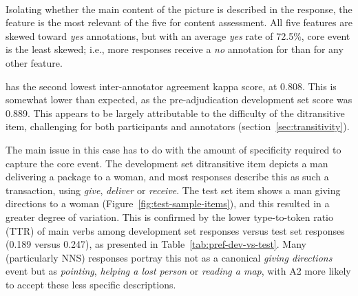 \paragraph{} Isolating whether the main content of the picture is described in the response, the  feature is the most relevant of the five for content assessment. All five features are skewed toward \textit{yes} annotations, but with an average \textit{yes} rate of 72.5\%, core event is the least skewed; i.e., more responses receive a \textit{no} annotation for  than for any other feature.

 has the second lowest inter-annotator agreement kappa score, at 0.808. This is somewhat lower than expected, as the pre-adjudication development set score was 0.889. This appears to be largely attributable to the difficulty of the ditransitive item, challenging for both participants and annotators (section~\ref{sec:transitivity}). 

The main issue in this case has to do with the amount of specificity required to capture the core event.  The development set ditransitive item depicts a man delivering a package to a woman, and most responses describe this as such a transaction, using \textit{give}, \textit{deliver} or \textit{receive}. The test set item shows a man giving directions to a woman (Figure~\ref{fig:test-sample-items}), and this resulted in a greater degree of variation. This is confirmed by the lower type-to-token ratio  (TTR) of main verbs among development set responses versus test set responses (0.189 versus 0.247), as presented in Table~\ref{tab:pref-dev-vs-test}. Many  (particularly NNS) responses portray this not as a canonical \textit{giving directions} event but as \textit{pointing}, 
\textit{helping a lost person} or \textit{reading a map}, with A2 more likely to accept these less specific descriptions.

